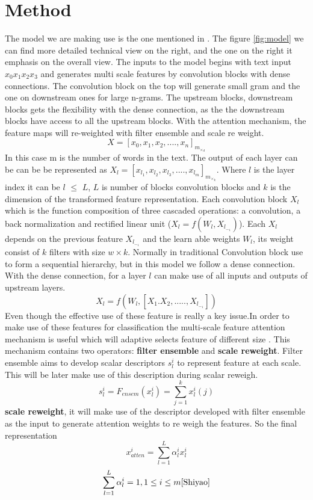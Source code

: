 \documentclass{MX2020}
\begin{document}
\section{Method}
The model we are making use is the one mentioned in \cite{Shiyao}. The figure \ref{fig:model} we can find more detailed technical view on the right, and the one on the right it emphasis on the overall view. The inputs to the model begins with text input \( x_0 x_1 x_2 x_3\) and generates multi scale features by convolution blocks with dense connections. The convolution block on the top will generate small gram and the one on downstream ones for large n-grams. The upstream blocks, downstream blocks gets the flexibility with the dense connection, as the the downstream blocks have access to all the upstream blocks. With the attention mechanism, the feature maps will re-weighted with filter ensemble and scale re weight. \[ X = [ x_0, x_1, x_2, ...., x_n]_m_\times_d \] In this case m is the number of words in the text. The output of each layer can be can be be represented as  \( X_l = [ x_l_1, x_l_2, x_l_3, ...., x_l_m]_m_\times_k \). Where \(l\) is the layer index it can be  \(l\) $\leq$ \(L\),  \(L\) is number of blocks convolution blocks and \(k\) is the dimension of the transformed feature representation.
\newline
Each convolution block \(X_l\) which is the function composition of three cascaded operations: a convolution, a back normalization and rectified linear unit (\(X_l = f(W_l, X_l_-_1)\))\cite{nair}. Each \(X_l\) depends on the previous feature \(X_l_-_1\) and the learn able weights \(W_l\), its weight consist of \(k\) filters with size \(w \times k\). Normally in traditional Convolution block use to form a sequential hierarchy, but in this model we follow a dense connection\cite{2017a}. With the dense connection, for a layer \(l\) can make use of all inputs and outputs of upstream layers.\[X_l = f(W_l, [X_1. X_2, ....., X_l_-_1])\] Even though the effective use of these feature is really a key issue.In order to make use of these features for classification the multi-scale feature attention mechanism is useful which will adaptive selects feature of different size \cite{Shiyao}. This mechanism contains two operators: \textbf{filter ensemble} and \textbf{scale reweight}.
\newline
Filter ensemble aims to develop scalar descriptors \(s_l^i\) to represent feature at each scale. This will be later make use of this description during scalar reweigh. \[s_l^i = F_{ensem}(x_l^i) = \sum_{j=1}^{k} x_l^i(j)\]
\newline
\textbf{scale reweight}, it will make use of the descriptor developed with filter ensemble as the input to generate attention weights to re weigh the features. So the final representation \[x_{atten} ^i = \sum_{l=1}^{L} \alpha_l^i x_l^i \] \[\sum_{l=1}^{L} \alpha_l^i = 1, 1 \leq i \leq m \cite{Shiyao}\]
\end{document}
